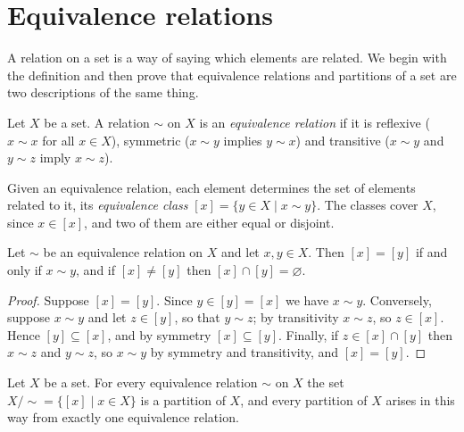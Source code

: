 \documentclass[10pt]{article}
\theoremstyle{break}
\begin{document}
\section{Equivalence relations}

A relation on a set is a way of saying which elements are related. We begin
with the definition and then prove that equivalence relations and partitions of
a set are two descriptions of the same thing.

\begin{definition}
Let $X$ be a set. A relation $\sim$ on $X$ is an \emph{equivalence relation}
if it is reflexive ($x \sim x$ for all $x \in X$), symmetric ($x \sim y$ implies
$y \sim x$) and transitive ($x \sim y$ and $y \sim z$ imply $x \sim z$).
\end{definition}

Given an equivalence relation, each element determines the set of elements
related to it, its \emph{equivalence class} $[x] = \{ y \in X \mid x \sim y \}$.
The classes cover $X$, since $x \in [x]$, and two of them are either equal or
disjoint.

\begin{lemma}
Let $\sim$ be an equivalence relation on $X$ and let $x, y \in X$. Then
$[x] = [y]$ if and only if $x \sim y$, and if $[x] \ne [y]$ then
$[x] \cap [y] = \varnothing$.
\end{lemma}

\begin{proof}
Suppose $[x] = [y]$. Since $y \in [y] = [x]$ we have $x \sim y$. Conversely,
suppose $x \sim y$ and let $z \in [y]$, so that $y \sim z$; by transitivity
$x \sim z$, so $z \in [x]$. Hence $[y] \subseteq [x]$, and by symmetry
$[x] \subseteq [y]$. Finally, if $z \in [x] \cap [y]$ then $x \sim z$ and
$y \sim z$, so $x \sim y$ by symmetry and transitivity, and $[x] = [y]$.
\end{proof}

\begin{theorem}
Let $X$ be a set. For every equivalence relation $\sim$ on $X$ the set
$X/{\sim} = \{ [x] \mid x \in X \}$ is a partition of $X$, and every partition
of $X$ arises in this way from exactly one equivalence relation.
\end{theorem}
\end{document}
